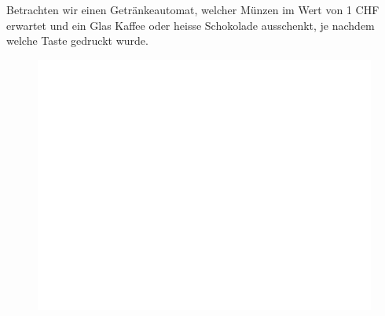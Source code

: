 %
%
Betrachten wir einen Getränkeautomat, welcher Münzen im Wert von 1 CHF erwartet und ein Glas Kaffee oder heisse Schokolade ausschenkt, je nachdem welche Taste gedruckt wurde.
\begin{figure}[H]
\centering
\includegraphics[width=0.5\linewidth]{Pictures/weiss.png}
\end{figure}
